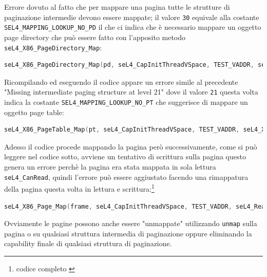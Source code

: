 Errore dovuto al fatto che per mappare una pagina tutte le strutture di paginazione intermedie devono essere mappate; il valore \texttt{30} equivale alla costante \texttt{SEL4\_MAPPING\_LOOKUP\_NO\_PD} il che ci indica che è necessario mappare un oggetto page directory che può essere fatto con l'apposito metodo \texttt{seL4\_X86\_PageDirectory\_Map}:
\begin{lstlisting}[language=C++]
seL4_X86_PageDirectory_Map(pd, seL4_CapInitThreadVSpace, TEST_VADDR, seL4_X86_Default_VMAttributes);
\end{lstlisting}
Ricompilando ed eseguendo il codice appare un errore simile al precedente "Missing intermediate paging structure at level 21" dove il valore \texttt{21} questa volta indica la costante \texttt{SEL4\_MAPPING\_LOOKUP\_NO\_PT} che suggerisce di mappare un oggetto page table:
\begin{lstlisting}[language=C++]
seL4_X86_PageTable_Map(pt, seL4_CapInitThreadVSpace, TEST_VADDR, seL4_X86_Default_VMAttributes);
\end{lstlisting}
Adesso il codice procede mappando la pagina però successivamente, come si può leggere nel codice sotto, avviene un tentativo di scrittura sulla pagina questo genera un errore perchè la pagina era stata mappata in sola lettura \texttt{seL4\_CanRead}, quindi l'errore può essere aggiustato facendo una rimappatura della pagina questa volta in lettura e scrittura:\footnote{codice completo \cite{mapping}}
\begin{lstlisting}[language=C++]
seL4_X86_Page_Map(frame, seL4_CapInitThreadVSpace, TEST_VADDR, seL4_ReadWrite, seL4_X86_Default_VMAttributes);
\end{lstlisting}
Ovviamente le pagine possono anche essere "unmappate" utilizzando \texttt{unmap} sulla pagina o su qualsiasi struttura intermedia di paginazione oppure eliminando la capability finale di qualsiasi struttura di paginazione.

